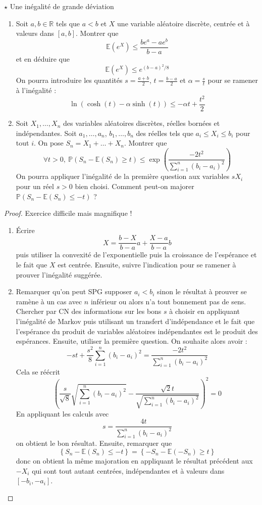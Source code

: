 \documentclass[french,a4paper]{article}
\renewcommand{\P}{\mathbb{P}}
\newcommand{\R}{\mathbb{R}}
\newcommand{\E}{\mathbb{E}}
\theoremstyle{plain}
\theoremstyle{definition}
\theoremstyle{remark}
\begin{document}
\begin{ex}[Moulin.75]{$\star$ Une inégalité de grande déviation}
	\begin{enumerate}
		\item Soit $a,b\in\R$ tels que $a<b$ et $X$ une variable aléatoire discrète, centrée et à valeurs dans $[a,b]$. Montrer que $$\E(e^X)\leqslant\frac{be^a-ae^b}{b-a}$$ et en déduire que $$\E(e^X)\leqslant e^{(b-a)^2/8}$$ On pourra introduire les quantités $s=\displaystyle\frac{a+b}{2}$, $t=\displaystyle\frac{b-a}{2}$ et $\alpha=\displaystyle\frac{s}{t}$ pour se ramener à l'inégalité : $$\ln\left(\cosh(t)-\alpha\sinh(t)\right)\leqslant-\alpha t+\frac{t^2}{2}$$
		\item Soit $X_1,\ldots, X_n$ des variables aléatoires discrètes, réelles bornées et indépendantes. Soit $a_1,\ldots,a_n$, $b_1,\ldots,b_n$ des réelles tels que $a_i\leqslant X_i\leqslant b_i$ pour tout $i$. On pose $S_n=X_1+\ldots+X_n$. Montrer que $$\forall t>0,\ \P(S_n-\E(S_n)\geqslant t)\leqslant\exp\left(\frac{-2t^2}{\displaystyle\sum_{i=1}^{n}(b_i-a_i)^2}\right)$$ On pourra appliquer l'inégalité de la première question aux variables $sX_i$ pour un réel $s>0$ bien choisi. Comment peut-on majorer $\P(S_n-\E(S_n)\leqslant -t)$ ?
	\end{enumerate}
\end{ex}
\begin{proof}
	Exercice difficile mais magnifique !
	\begin{enumerate}
		\item Écrire $$X=\frac{b-X}{b-a}a+\frac{X-a}{b-a}b$$ puis utiliser la convexité de l'exponentielle puis la croissance de l'espérance et le fait que $X$ est centrée.  Ensuite, suivre l'indication pour se ramener à prouver l'inégalité suggérée.
		\item Remarquer qu'on peut SPG supposer $a_i<b_i$ sinon le résultat à prouver se ramène à un cas avec $n$ inférieur ou alors n'a tout bonnement pas de sens. Chercher par CN des informations sur les bons $s$ à choisir en appliquant l'inégalité de Markov puis utilisant un transfert d'indépendance et le fait que l'espérance du produit de variables aléatoires indépendantes est le produit des espérances. Ensuite, utiliser la première question. On souhaite alors avoir : $$-st+\frac{s^2}{8}\sum_{i=1}^{n}(b_i-a_i)^2=\frac{-2t^2}{\displaystyle\sum_{i=1}^{n}(b_i-a_i)^2}$$ Cela se réécrit $$\left(\frac{s}{\sqrt{8}}\sqrt{\sum_{i=1}^{n}(b_i-a_i)^2}-\frac{\sqrt{2}t}{\sqrt{\displaystyle\sum_{i=1}^{n}(b_i-a_i)^2}}\right)^2=0$$ En appliquant les calculs avec $$s=\frac{4t}{\displaystyle\sum_{i=1}^{n}(b_i-a_i)^2}$$ on obtient le bon résultat. Ensuite, remarquer que $$\left\{S_n-\E(S_n)\leqslant -t\right\}=\left\{-S_n-\E(-S_n)\geqslant t\right\}$$ donc on obtient la même majoration en appliquant le résultat précédent aux $-X_i$ qui sont tout autant centrées, indépendantes et à valeurs dans $[-b_i,-a_i]$. 
	\end{enumerate}
\end{proof}
\end{document}
